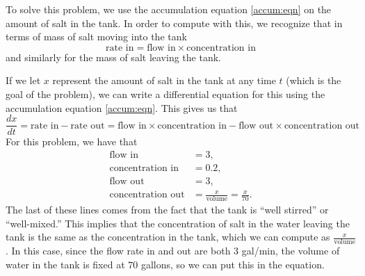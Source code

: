 \documentclass{ximera}
\begin{document}
\begin{exampleSol}
    To solve this problem, we use the accumulation equation \eqref{accum:eqn} on the amount of salt in the tank. In order to compute with this, we recognize that in terms of mass of salt moving into the tank
    \begin{equation*}
        \text{rate in} = \text{flow in} \times \text{concentration in}
    \end{equation*}
    and similarly for the mass of salt leaving the tank. 
    
    If we let $x$ represent the amount of salt in the tank at any time $t$ (which is the goal of the problem), we can write a differential equation for this using the accumulation equation \eqref{accum:eqn}. This gives us that
    \begin{equation*}
        \frac{dx}{dt} = \text{rate in} - \text{rate out} = \text{flow in} \times \text{concentration in} - \text{flow out} \times \text{concentration out}
    \end{equation*}
    For this problem, we have that
    \begin{align*}
        \text{flow in} &= 3 , \\
        \text{concentration in} &= 0.2 , \\
        \text{flow out} &= 3 , \\
        \text{concentration out} &= \frac{x}{\text{volume}} = \frac{x}{70}.
    \end{align*}
    The last of these lines comes from the fact that the tank is ``well stirred'' or ``well-mixed.'' This implies that the concentration of salt in the water leaving the tank is the same as the concentration in the tank, which we can compute as $\frac{x}{\text{volume}}$. In this case, since the flow rate in and out are both 3 gal/min, the volume of water in the tank is fixed at $70$ gallons, so we can put this in the equation. 
    

\end{exampleSol}
\end{document}
